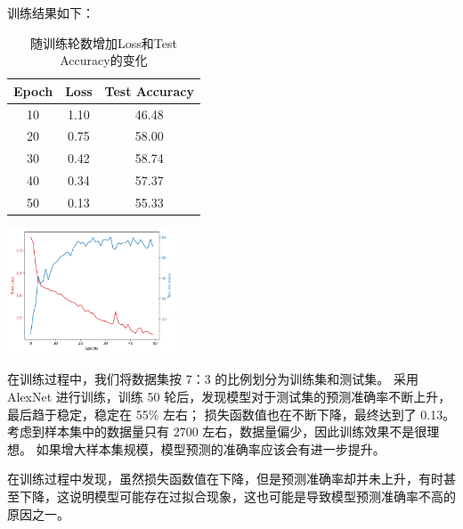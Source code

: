 训练结果如下：
\begin{table}[H]
    \begin{minipage}[b]{0.56\linewidth}
    \centering
    \begin{tabular}{c|c|c}
        \hline
        Epoch & Loss & Test Accuracy \\ \hline \hline
        10 & 1.10 & 46.48 \\ \hline
        20 & 0.75 & 58.00 \\ \hline
        30 & 0.42 & 58.74 \\ \hline
        40 & 0.34 & 57.37 \\ \hline
        50 & 0.13 & 55.33 \\ \hline
       \end{tabular}
        \caption{随训练轮数增加Loss和Test Accuracy的变化}
    \end{minipage}
    \begin{minipage}[b]{0.4\linewidth}
    \centering
    \includegraphics[width=50mm]{../../AlexNet/AlexNet.png}
    \end{minipage}
    \end{table}



在训练过程中，我们将数据集按 7：3 的比例划分为训练集和测试集。
采用 AlexNet 进行训练，训练 50 轮后，发现模型对于测试集的预测准确率不断上升，最后趋于稳定，稳定在 55\% 左右；
损失函数值也在不断下降，最终达到了 0.13。考虑到样本集中的数据量只有 2700 左右，数据量偏少，因此训练效果不是很理想。
如果增大样本集规模，模型预测的准确率应该会有进一步提升。 \par
在训练过程中发现，虽然损失函数值在下降，但是预测准确率却并未上升，有时甚至下降，这说明模型可能存在过拟合现象，这也可能是导致模型预测准确率不高的原因之一。
